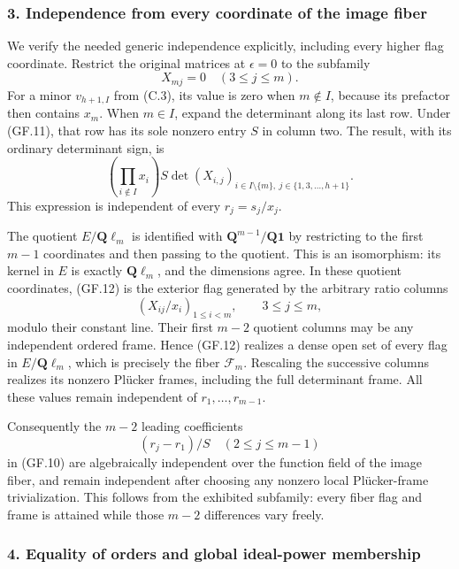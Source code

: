 \documentclass[
  10pt,
]{article}
\begin{document}
\subsubsection{3. Independence from every coordinate of the image
fiber}\label{independence-from-every-coordinate-of-the-image-fiber}

We verify the needed generic independence explicitly, including every
higher flag coordinate. Restrict the original matrices at \(\epsilon=0\)
to the subfamily \[
X_{mj}=0\quad(3\le j\le m).
\tag{GF.11}
\] For a minor \(v_{h+1,I}\) from (C.3), its value is zero when
\(m\notin I\), because its prefactor then contains \(x_m\). When
\(m\in I\), expand the determinant along its last row. Under (GF.11),
that row has its sole nonzero entry \(S\) in column two. The result,
with its ordinary determinant sign, is \[
\left(\prod_{i\notin I}x_i\right)S
\det(X_{i,j})_{i\in I\setminus\{m\},\ j\in\{1,3,\ldots,h+1\}}.
\tag{GF.12}
\] This expression is independent of every \(r_j=s_j/x_j\).

The quotient \(E/\mathbf Q\ell_m\) is identified with
\(\mathbf Q^{m-1}/\mathbf Q\mathbf1\) by restricting to the first
\(m-1\) coordinates and then passing to the quotient. This is an
isomorphism: its kernel in \(E\) is exactly \(\mathbf Q\ell_m\), and the
dimensions agree. In these quotient coordinates, (GF.12) is the exterior
flag generated by the arbitrary ratio columns \[
(X_{ij}/x_i)_{1\le i<m},\qquad3\le j\le m,
\] modulo their constant line. Their first \(m-2\) quotient columns may
be any independent ordered frame. Hence (GF.12) realizes a dense open
set of every flag in \(E/\mathbf Q\ell_m\), which is precisely the fiber
\(\mathcal F_m\). Rescaling the successive columns realizes its nonzero
Plücker frames, including the full determinant frame. All these values
remain independent of \(r_1,\ldots,r_{m-1}\).

Consequently the \(m-2\) leading coefficients \[
(r_j-r_1)/S\quad(2\le j\le m-1)
\] in (GF.10) are algebraically independent over the function field of
the image fiber, and remain independent after choosing any nonzero local
Plücker-frame trivialization. This follows from the exhibited subfamily:
every fiber flag and frame is attained while those \(m-2\) differences
vary freely.

\subsubsection{4. Equality of orders and global ideal-power
membership}\label{equality-of-orders-and-global-ideal-power-membership}
\end{document}
